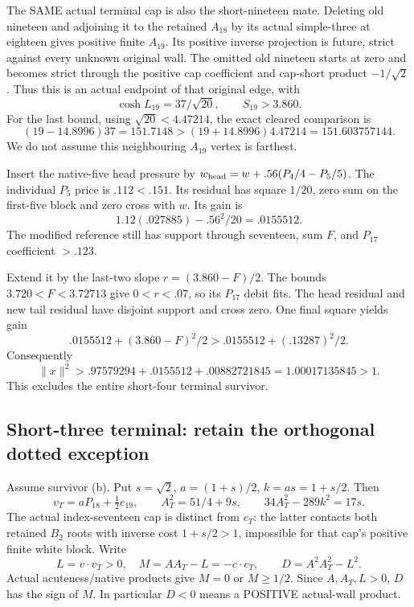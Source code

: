 The SAME actual terminal cap is
also the short-nineteen mate.
Deleting old nineteen and adjoining
it to the retained \(A_{18}\) by
its actual simple-three at eighteen
gives positive finite \(A_{19}\).
Its positive inverse projection
is future, strict against every
unknown original wall.
The omitted old nineteen starts
at zero and becomes strict through
the positive cap coefficient and
cap-short product \(-1/\sqrt2\).
Thus this is an actual endpoint
of that original edge, with
\[
                    \cosh L_{19}=37/\sqrt{20},\qquad S_{19}>3.860 .
\]
For the last bound, using
\(\sqrt{20}<4.47214\), the exact
cleared comparison is
\[
 (19-14.8996)37=151.7148
              >(19+14.8996)4.47214=151.603757144 .
\]
We do not assume this neighbouring
\(A_{19}\) vertex is farthest.

Insert the native-five head
pressure by
\(w_{\rm head}=w+.56(P_4/4-P_5/5)\).
The individual \(P_5\) price
is \(.112<.151\).
Its residual has square \(1/20\),
zero sum on the first-five block
and zero cross with \(w\).
Its gain is
\[
                         1.12(.027885)-.56^2/20=.0155512 .
\]
The modified reference still has
support through seventeen, sum
\(F\), and \(P_{17}\) coefficient
\(>.123\).

Extend it by the last-two slope
\(r=(3.860-F)/2\).
The bounds \(3.720<F<3.72713\)
give \(0<r<.07\), so its
\(P_{17}\) debit fits.
The head residual and new tail
residual have disjoint support
and cross zero.
One final square yields gain
\[
             .0155512+(3.860-F)^2/2
                     >.0155512+(.13287)^2/2 .
\]
Consequently
\[
                         \|x\|^2>
 .97579294+.0155512+.00882721845=1.00017135845>1 .
\]
This excludes the entire
short-four terminal survivor.

\subsection{Short-three terminal: retain the orthogonal dotted exception}
\label{app:exact19:Bshortthreefloor}

Assume survivor (b).
Put \(s=\sqrt2\), \(a=(1+s)/2\),
\(k=as=1+s/2\).
Then
\[
 v_T=aP_{18}+\tfrac12e_{19},\qquad
 A_T^2=51/4+9s,\qquad
                         34A_T^2-289k^2=17s .
\]
The actual index-seventeen cap
is distinct from \(c_T\): the
latter contacts both retained
\(B_2\) roots with inverse cost
\(1+s/2>1\), impossible for that
cap's positive finite white block.
Write
\[
          L=v\cdot v_T>0,\quad M=AA_T-L=-c\cdot c_T,\qquad
                    D=A^2A_T^2-L^2 .
\]
Actual acuteness/native products
give \(M=0\) or \(M\ge1/2\).
Since \(A,A_T,L>0\), \(D\) has
the sign of \(M\).
In particular \(D<0\) means a
POSITIVE actual-wall product.

